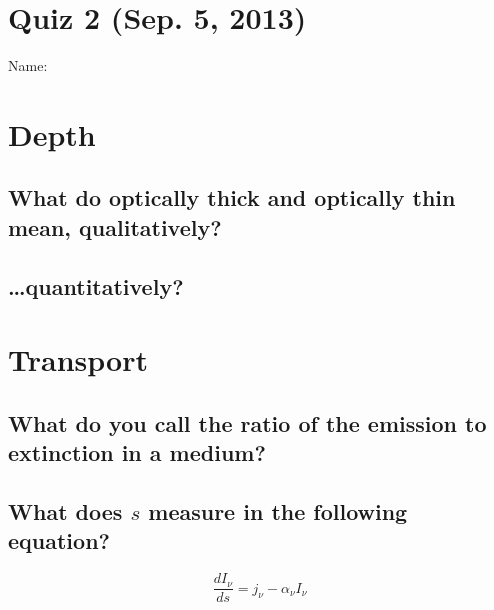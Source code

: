 \documentclass[11pt]{article}
\begin{document}
\pagestyle{empty}
\parindent=0pt

\section*{\centering Quiz 2 (Sep.  5, 2013)}

{\large
Name:\\
}

\section{Depth}
\subsection{What do optically thick and optically thin mean, qualitatively?}
\vspace{1.5in}
\subsection{\dots quantitatively?}
\vspace{1.5in}

\section{Transport}

\subsection{What do you call the ratio of the emission to extinction in a medium?}
\vspace{1.5in}
\subsection{What does $s$ measure in the following equation?}
\begin{equation}
\frac{dI_\nu}{ds}=j_\nu-\alpha_\nu I_\nu
\end{equation}
\vspace{1.5in}
\end{document}
